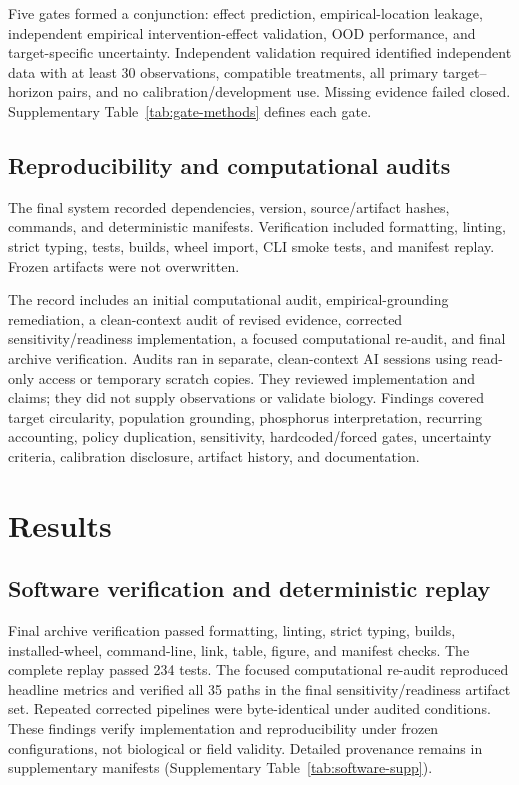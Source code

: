 \documentclass[11pt]{article}
\begin{document}
Five gates formed a conjunction: effect prediction, empirical-location leakage, independent empirical intervention-effect validation, OOD performance, and target-specific uncertainty. Independent validation required identified independent data with at least 30 observations, compatible treatments, all primary target--horizon pairs, and no calibration/development use. Missing evidence failed closed. Supplementary Table~\ref{tab:gate-methods} defines each gate.

\subsection{Reproducibility and computational audits}

The final system recorded dependencies, version, source/artifact hashes, commands, and deterministic manifests. Verification included formatting, linting, strict typing, tests, builds, wheel import, CLI smoke tests, and manifest replay. Frozen artifacts were not overwritten.

The record includes an initial computational audit, empirical-grounding remediation, a clean-context audit of revised evidence, corrected sensitivity/readiness implementation, a focused computational re-audit, and final archive verification. Audits ran in separate, clean-context AI sessions using read-only access or temporary scratch copies. They reviewed implementation and claims; they did not supply observations or validate biology. Findings covered target circularity, population grounding, phosphorus interpretation, recurring accounting, policy duplication, sensitivity, hardcoded/forced gates, uncertainty criteria, calibration disclosure, artifact history, and documentation.

\section{Results}

\subsection{Software verification and deterministic replay}

Final archive verification passed formatting, linting, strict typing, builds, installed-wheel, command-line, link, table, figure, and manifest checks. The complete replay passed 234 tests. The focused computational re-audit reproduced headline metrics and verified all 35 paths in the final sensitivity/readiness artifact set. Repeated corrected pipelines were byte-identical under audited conditions. These findings verify implementation and reproducibility under frozen configurations, not biological or field validity. Detailed provenance remains in supplementary manifests (Supplementary Table~\ref{tab:software-supp}).
\end{document}
